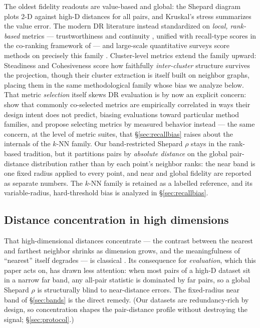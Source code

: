 \documentclass[11pt]{article}
\begin{document}
The oldest fidelity readouts are value-based and global: the Shepard diagram
\cite{shepard1962} plots 2-D against high-D distances for all pairs, and
Kruskal's stress \cite{kruskal1964mds} summarizes the value error. The
modern DR literature instead standardized on \emph{local, rank-based}
metrics --- trustworthiness and continuity
\cite{venna2006trustworthiness}, unified with recall-type scores in the
co-ranking framework of \cite{lee2009qualityassessment} --- and large-scale
quantitative surveys score methods on precisely this family
\cite{espadoto2019survey}. Cluster-level metrics extend the family upward:
Steadiness and Cohesiveness \cite{jeon2021steadiness} score how faithfully
\emph{inter-cluster} structure survives the projection, though their cluster
extraction is itself built on neighbor graphs, placing them in the same
methodological family whose bias we analyze below. That metric
\emph{selection} itself skews DR evaluation is by now an explicit concern:
\cite{bae2025metric} show that commonly co-selected metrics are empirically
correlated in ways their design intent does not predict, biasing evaluations
toward particular method families, and propose selecting metrics by measured
behavior instead --- the same concern, at the level of metric suites, that
\S\ref{sec:recallbias} raises about the internals of the $k$-NN family. Our
band-restricted Shepard $\rho$ stays in the
rank-based tradition, but it partitions pairs by \emph{absolute distance} on
the global pair-distance distribution rather than by each point's neighbor
ranks: the near band is one fixed radius applied to every point, and near
and global fidelity are reported as separate numbers. The $k$-NN family is
retained as a labelled reference, and its variable-radius, hard-threshold
bias is analyzed in \S\ref{sec:recallbias}.

\subsection{Distance concentration in high dimensions}

That high-dimensional distances concentrate --- the contrast between the
nearest and farthest neighbor shrinks as dimension grows, and the
meaningfulness of ``nearest'' itself degrades --- is classical
\cite{beyer1999nearest,aggarwal2001surprising}. Its consequence for
\emph{evaluation}, which this paper acts on, has drawn less attention: when
most pairs of a high-D dataset sit in a narrow far band, any all-pair
statistic is dominated by far pairs, so a global Shepard $\rho$ is
structurally blind to near-distance errors. The fixed-radius near band of
\S\ref{sec:bands} is the direct remedy. (Our datasets are
redundancy-rich by design, so concentration shapes the pair-distance
profile without destroying the signal; \S\ref{sec:protocol}.)
\end{document}
